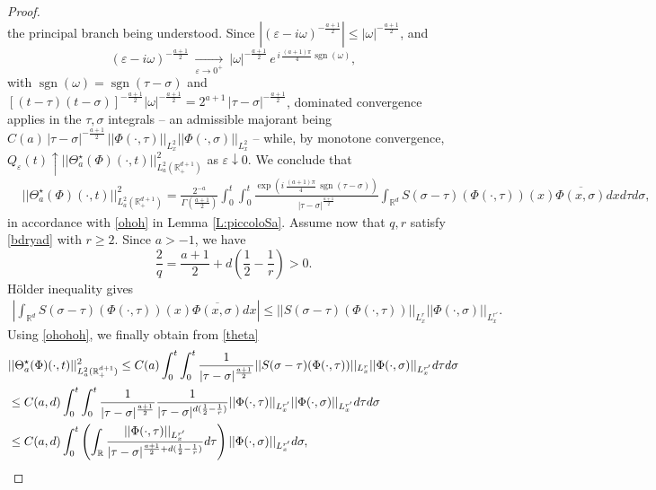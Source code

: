 \documentclass[11pt,letter]{amsart}
\def \RN {\mathbb{R}_+^{d+1}}
\def \R {\mathbb{R}}
\newcommand{\Rd}{\mathbb R^d}
\numberwithin{equation}{section}
\newcommand{\ve}{\varepsilon}
\numberwithin{equation}{section}
\begin{document}
\begin{proof}
\[\]
the principal branch being understood. Since $|(\ve-i\omega)^{-\frac{a+1}2}|\le |\omega|^{-\frac{a+1}2}$, and
\[
(\ve-i\omega)^{-\frac{a+1}2}\ \underset{\ve\to 0^+}{\longrightarrow}\ |\omega|^{-\frac{a+1}2}\, e^{\,i\,\frac{(a+1)\pi}{4}\operatorname{sgn}(\omega)},
\]
with $\operatorname{sgn}(\omega) = \operatorname{sgn}(\tau-\sigma)$ and $\left[(t-\tau)(t-\sigma)\right]^{-\frac{a+1}2}|\omega|^{-\frac{a+1}2} = 2^{a+1}\, |\tau-\sigma|^{-\frac{a+1}2}$, dominated convergence applies in the $\tau, \sigma$ integrals -- an admissible majorant being $C(a)\, |\tau-\sigma|^{-\frac{a+1}2}\, ||\Phi(\cdot,\tau)||_{L^2_x} ||\Phi(\cdot,\sigma)||_{L^2_x}$ -- while, by monotone convergence, $Q_\ve(t)\uparrow ||\Theta_a^\star(\Phi)(\cdot,t)||_{L^2_a(\RN)}^2$ as $\ve\downarrow 0$. We conclude that
\begin{align}\label{theta}
& ||\Theta_a^\star(\Phi)(\cdot,t)||_{L^2_a(\RN)}^2 = \frac{2^{-a}}{\Gamma\!\left(\frac{a+1}{2}\right)}
\int_0^t \int_0^t  \frac{\exp\!\left(i\,\frac{(a+1)\pi}{4}\,\operatorname{sgn}(\tau-\sigma)\right)}{|\tau-\sigma|^{\frac{a+1}{2}}} \int_{\Rd} S(\sigma-\tau)(\Phi(\cdot,\tau))(x) \overline{\Phi(x,\sigma)} dx d\tau d\sigma,
\end{align}
in accordance with \eqref{ohoh} in Lemma \ref{L:piccoloSa}. Assume now that $q, r$ satisfy \eqref{bdryad} with $r\ge 2$. Since $a>-1$, we have
\begin{equation}\label{qzero}
\frac 2q = \frac{a+1}2 + d(\frac 12 - \frac 1r) > 0.
\end{equation}
H\"older inequality gives 
\begin{align}\label{ohohoh}
\left|\int_{\Rd} S(\sigma-\tau)(\Phi(\cdot,\tau))(x) \overline{\Phi(x,\sigma)} dx\right| \le ||S(\sigma-\tau)(\Phi(\cdot,\tau))||_{L^r_x} ||\Phi(\cdot,\sigma)||_{L^{r'}_x}.
\end{align}
Using \eqref{ohohoh}, we finally obtain from \eqref{theta}
\begin{align}\label{theta2}
& ||\Theta_a^\star(\Phi)(\cdot,t)||_{L^2_a(\RN)}^2  \le C(a) \int_0^t \int_0^t \frac{1}{|\tau-\sigma|^{\frac{a+1}2}} ||S(\sigma-\tau)(\Phi(\cdot,\tau))||_{L^r_x} ||\Phi(\cdot,\sigma)||_{L^{r'}_x} d\tau d\sigma
\\
& \le C(a,d) \int_0^t \int_0^t \frac{1}{|\tau-\sigma|^{\frac{a+1}2}} \frac{1}{|\tau-\sigma|^{d(\frac{1}2-\frac 1r)}}||\Phi(\cdot,\tau)||_{L^{r'}_x} ||\Phi(\cdot,\sigma)||_{L^{r'}_x} d\tau d\sigma
\notag
\\
& \le C(a,d) \int_0^t \left(\int_{\R}  \frac{||\Phi(\cdot,\tau)||_{L^{r'}_x}}{|\tau-\sigma|^{\frac{a+1}2+ d(\frac{1}2-\frac 1r)}} d\tau\right) ||\Phi(\cdot,\sigma)||_{L^{r'}_x}  d\sigma,

\end{align}
\end{proof}
\end{document}
